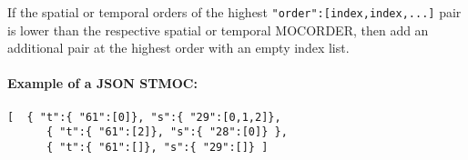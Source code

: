 If the spatial or temporal orders of the highest \verb|"order":[index,index,...]| pair is lower than the respective spatial or temporal MOCORDER, then add an additional pair at the highest order with an empty index list.

\paragraph{Example of a JSON STMOC:}
\par\noindent
\begin{lstlisting}[]
   [  { "t":{ "61":[0]}, "s":{ "29":[0,1,2]},
      { "t":{ "61":[2]}, "s":{ "28":[0]} },
      { "t":{ "61":[]}, "s":{ "29":[]} ]
\end{lstlisting}

